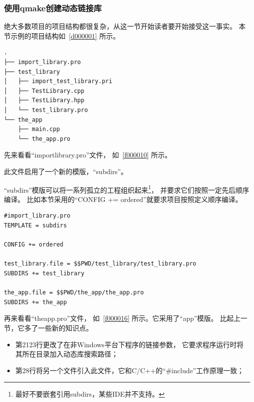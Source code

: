 %
% 
\FloatBarrier
\subsubsection{
使用qmake创建动态链接库
}\label{ss000710}


绝大多数项目的项目结构都很复杂，从这一节开始读者要开始接受这一事实。
本节示例的项目结构如\treeindexnumbernameone\ \ref{d000001}
所示。

\label{d000001}    %
\begin{lstlisting}[caption=GoodLuck,
numbers=none,
title=\treeindexnumbernameone \thetreeindexnumber
]
.
├── import_library.pro
├── test_library
│   ├── import_test_library.pri
│   ├── TestLibrary.cpp
│   ├── TestLibrary.hpp
│   └── test_library.pro
└── the_app
    ├── main.cpp
    └── the_app.pro
\end{lstlisting}          %


先来看看“import\underline{\hspace{0.5em}}library.pro”文件，
如\lstlistingname\ \ref{f000010}
所示。

此文件启用了一个新的模版，“subdirs”。

“subdirs”模版可以将一系列孤立的工程组织起来\footnote{
最好不要嵌套引用subdirs，某些IDE并不支持。
}，
并要求它们按照一定先后顺序编译。
比如本节采用的“CONFIG {\sourcefonttwo{}+}{\sourcefonttwo{}=} ordered”就要求项目按照定义顺序编译。

\begin{lstlisting}[label=f000010,
caption=GoodLuck,
title=\lstlistingname\ \thelstlisting
]
#import_library.pro
TEMPLATE = subdirs

CONFIG += ordered

test_library.file = $$PWD/test_library/test_library.pro
SUBDIRS += test_library

the_app.file = $$PWD/the_app/the_app.pro
SUBDIRS += the_app
\end{lstlisting}          %


再来看看“the\underline{\hspace{0.5em}}app.pro”文件，
如\lstlistingname\ \ref{f000016} 所示。它采用了“app”模版。
比起上一节，它多了一些新的知识点。
\begin{itemize}
\item 第21\raisebox{0.16ex}{\sourcefonttwo\~{}}23行更改了在非Windows平台下程序的链接参数，
它要求程序运行时将其所在目录加入动态库搜索路径；
\item 第28行将另一个文件引入此文件，它和C/C{\sourcefonttwo{}+}{\sourcefonttwo{}+}的“{\sourcefonttwo\#}include”工作原理一致；
\end{itemize}


